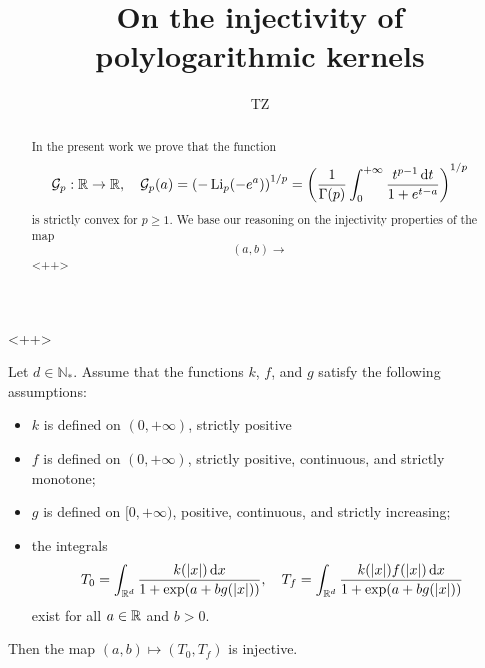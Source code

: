 \documentclass[a4paper]{article}
\author{TZ}
\title{On the injectivity of polylogarithmic kernels}
\begin{document}
\maketitle
\begin{abstract}
	In the present work we prove that the function\[
		\mathcal G_p:{\mathbb R}\to{\mathbb R},\quad \mathcal G_p(a) = \left( -\operatorname{Li}_p(-e^a) \right)^{1/p}=\left( \frac{1}{\Gamma(p)}\int_{0}^{+\infty}\frac{t^{p-1}{\,\mathrm dt}}{1+e^{t-a}} \right)^{1/p}
	\]
	is strictly convex for $p\ge1$. We base our reasoning on the injectivity properties of the map
	\[
		(a,b)\to
	\]<++>
\end{abstract}<++>
\begin{lemma}
	Let $d\in\mathbb N_*$. Assume that the functions $k$, $f$, and $g$ satisfy the following assumptions:
	\begin{itemize}
		\item $k$ is defined on $(0,+\infty)$, strictly positive
		\item $f$ is defined on $(0,+\infty)$, strictly positive, continuous, and strictly monotone;
		\item $g$ is defined on $[0,+\infty)$, positive, continuous, and strictly increasing;
		\item the integrals 
		\[
			T_0 = \int_{{\mathbb R^d}}^{}\frac{k(|x|){\,\mathrm{d} x}}{1+\exp(a+bg(|x|))},\quad T_f = \int_{{\mathbb R^d}}^{}\frac{k(|x|)f(|x|){\,\mathrm{d} x}}{1+\exp(a+bg(|x|))}
		\]
		exist for all $a\in{\mathbb R}$ and $b>0$.
	\end{itemize}
	Then the map $(a,b)\mapsto (T_0,T_f)$ is injective.
	\label{le:basic}
\end{lemma}
\end{document}
